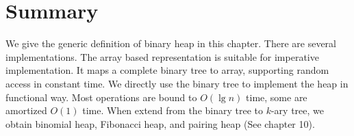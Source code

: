 \documentclass[b5paper]{article}
\begin{document}
\section{Summary}

We give the generic definition of binary heap in this chapter. There are several implementations. The array based representation is suitable for imperative implementation. It maps a complete binary tree to array, supporting random access in constant time. We directly use the binary tree to implement the heap in functional way. Most operations are bound to $O(\lg n)$ time, some are amortized $O(1)$ time\cite{okasaki-book}. When extend from the binary tree to $k$-ary tree, we obtain binomial heap, Fibonacci heap, and pairing heap (See chapter 10).

\begin{Exercise}\label{ex:other-binary-heaps}
\end{Exercise}
\end{document}
